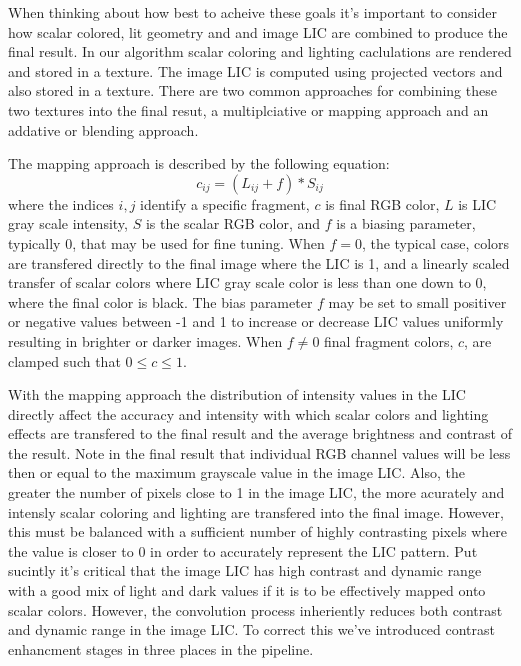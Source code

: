 \documentclass[a4paper,10pt]{article}
\begin{document}
When thinking about how best to acheive these goals it's important to consider how scalar colored, lit geometry and and image LIC are combined to produce the final result. In our algorithm scalar coloring and lighting caclulations are rendered and stored in a texture. The image LIC is computed using projected vectors and also stored in a texture. There are two common approaches for combining these two textures into the final resut, a multiplciative or mapping approach\cite{image-lic} and an addative or blending approach\cite{surface lic}.

The mapping approach is described by the following equation:
\begin{equation}
c_{ij} = ( L_{ij} + f ) * S_{ij}
\label{eqn:color-map}
\end{equation}
where the indices $i,j$ identify a specific fragment, $c$ is final RGB color, $L$ is LIC gray scale intensity, $S$ is the scalar RGB color, and $f$ is a biasing parameter, typically 0, that may be used for fine tuning. When $f=0$, the typical case, colors are transfered directly to the final image where the LIC is 1, and a linearly scaled transfer of scalar colors where LIC gray scale color is less than one down to 0, where the final color is black. The bias parameter $f$ may be set to small positiver or negative values between -1 and 1 to increase or decrease LIC values uniformly resulting in brighter or darker images. When $f\neq0$ final fragment colors, $c$, are clamped such that $0 \leq c \leq 1$.

With the mapping approach the distribution of intensity values in the LIC directly affect the accuracy and intensity with which scalar colors and lighting effects are transfered to the final result and the average brightness and contrast of the result. Note in the final result that individual RGB channel values will be less then or equal to the maximum grayscale value in the image LIC. Also, the greater the number of pixels close to 1 in the image LIC, the more acurately and intensly scalar coloring and lighting are transfered into the final image. However, this must be balanced with a sufficient number of highly contrasting pixels where the value is closer to 0 in order to accurately represent the LIC pattern. Put sucintly it's critical that the image LIC has high contrast and dynamic range with a good mix of light and dark values if it is to be effectively mapped onto scalar colors. However, the convolution process inheriently reduces both contrast and dynamic range in the image LIC. To correct this we've introduced contrast enhancment stages in three places in the pipeline.
\end{document}
